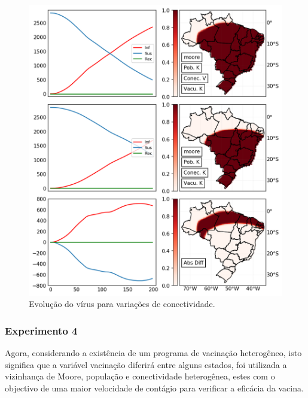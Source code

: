 \documentclass[a4paper,12pt]{article}
\begin{document}
\begin{figure}[!ht]
 \begin{center}
  \includegraphics[width=1\linewidth]{fig/Conectividad.png}
 \end{center}
 \caption{Evolução do vírus para variações de conectividade.}
\label{figure:conec}
\end{figure}

\newpage
\subsubsection{Experimento 4}
\label{sub:exp4}
Agora, considerando a existência de um programa de vacinação heterogêneo, isto significa que a variável vacinação diferirá entre alguns estados, foi utilizada a vizinhança de Moore, população e conectividade heterogênea, estes com o objectivo de uma maior velocidade de contágio para verificar a eficácia da vacina.
\end{document}
